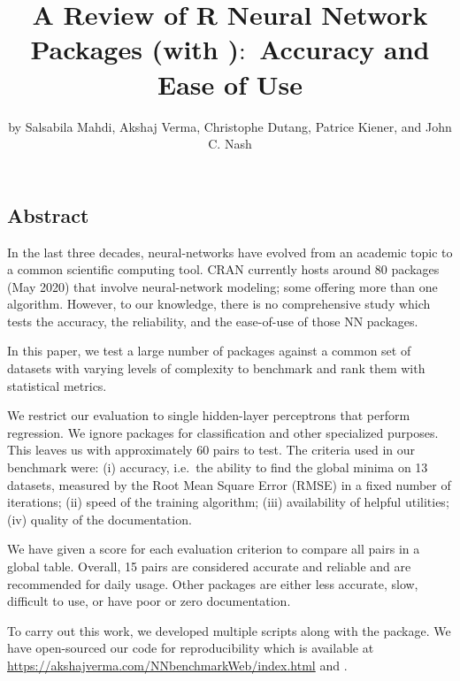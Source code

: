 \title{A Review of R Neural Network Packages (with
)\(:\) Accuracy and Ease of Use}
\author{by Salsabila Mahdi, Akshaj Verma, Christophe Dutang, Patrice
Kiener, and John C. Nash}

\maketitle


\hypertarget{abstract}{%
\subsection{Abstract}\label{abstract}}

In the last three decades, neural-networks have evolved from an academic
topic to a common scientific computing tool. CRAN currently hosts around
80 packages (May 2020) that involve neural-network modeling; some
offering more than one algorithm. However, to our knowledge, there is no
comprehensive study which tests the accuracy, the reliability, and the
ease-of-use of those NN packages.

In this paper, we test a large number of packages against a common set
of datasets with varying levels of complexity to benchmark and rank them
with statistical metrics.

We restrict our evaluation to single hidden-layer perceptrons that
perform regression. We ignore packages for classification and other
specialized purposes. This leaves us with approximately 60
 pairs to test. The criteria used in our
benchmark were: (i) accuracy, i.e.~the ability to find the global minima
on 13 datasets, measured by the Root Mean Square Error (RMSE) in a fixed
number of iterations; (ii) speed of the training algorithm; (iii)
availability of helpful utilities; (iv) quality of the documentation.

We have given a score for each evaluation criterion to compare all
 pairs in a global table. Overall, 15 pairs are
considered accurate and reliable and are recommended for daily usage.
Other packages are either less accurate, slow, difficult to use, or have
poor or zero documentation.

To carry out this work, we developed multiple scripts along with the
 package. We have open-sourced our code for
reproducibility which is available at
\url{https://akshajverma.com/NNbenchmarkWeb/index.html} and
.

